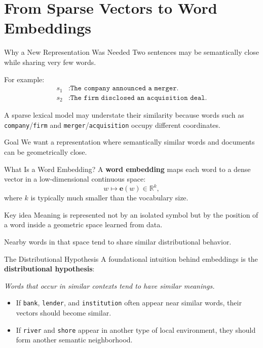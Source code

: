 \documentclass[aspectratio=169]{beamer}
\newcommand{\vect}[1]{\bm{#1}}
\newcommand{\R}{\mathbb{R}}
\begin{document}
\section{From Sparse Vectors to Word Embeddings}
%
\begin{frame}{Why a New Representation Was Needed}
Two sentences may be semantically close while sharing very few words.

\vspace{0.15cm}
For example:
\begin{align*}
 s_1 &: \texttt{The company announced a merger.}\\
 s_2 &: \texttt{The firm disclosed an acquisition deal.}
\end{align*}

A sparse lexical model may understate their similarity because words such as
\texttt{company}/\texttt{firm} and \texttt{merger}/\texttt{acquisition} occupy different coordinates.

\vspace{0.15cm}
\begin{block}{Goal}
We want a representation where semantically similar words and documents can be geometrically close.
\end{block}
\end{frame}
%
%
\begin{frame}{What Is a Word Embedding?}
A \textbf{word embedding} maps each word to a dense vector in a low-dimensional continuous space:
\[
 w \longmapsto \vect{e}(w) \in \R^k,
\]
where $k$ is typically much smaller than the vocabulary size.

\vspace{0.15cm}
\begin{block}{Key idea}
Meaning is represented not by an isolated symbol but by the position of a word inside a geometric space learned from data.
\end{block}

\vspace{0.1cm}
Nearby words in that space tend to share similar distributional behavior.
\end{frame}
%
%
\begin{frame}{The Distributional Hypothesis}
A foundational intuition behind embeddings is the \textbf{distributional hypothesis}:
\begin{center}
\emph{Words that occur in similar contexts tend to have similar meanings.}
\end{center}

\vspace{0.15cm}
\begin{itemize}
    \item If \texttt{bank}, \texttt{lender}, and \texttt{institution} often appear near similar words, their vectors should become similar.
    \item If \texttt{river} and \texttt{shore} appear in another type of local environment, they should form another semantic neighborhood.
\end{itemize}
\end{frame}
\end{document}
